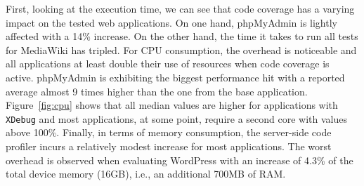 \begin{table}[]
  \centering
  \caption{Measurements of the execution time, the CPU and memory consumption for the tested web applications with XDebug and Code Coverage (CC) and without XDebug. The reported values for the CPU and memory correspond to the average for each application.}
  \label{table:performance}
\end{table}

First, looking at the execution time, we can see that code coverage has a
varying impact on the tested web applications.
On one hand, phpMyAdmin is lightly affected with a 14\% increase.
On the other hand, the time it takes to run all tests for MediaWiki has
tripled.
For CPU consumption, the overhead is noticeable and all applications at
least double their use of resources when code coverage is active.
phpMyAdmin is exhibiting the biggest performance hit with a reported
average almost 9 times higher than the one from the base application.
Figure~\ref{fig:cpu} shows that all median values are higher for applications
with \texttt{XDebug} and most applications, at some point, require a second
core with values above 100\%. Finally, in terms of memory consumption,
the server-side code profiler incurs a relatively modest increase for most
applications. The worst overhead is observed when evaluating WordPress with
an increase of 4.3\% of the total device memory (16GB), i.e., an additional
700MB of RAM.


